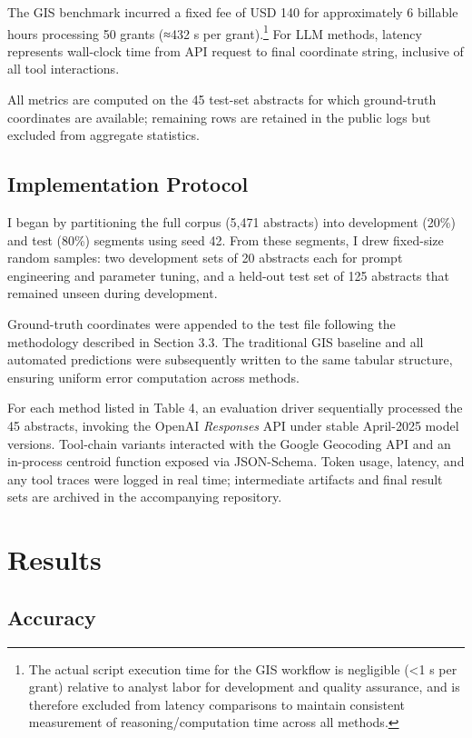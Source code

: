 The GIS benchmark incurred a fixed fee of USD 140 for approximately 6
billable hours processing 50 grants (≈432 s per grant).\footnote{The
  actual script execution time for the GIS workflow is negligible
  (\textless1 s per grant) relative to analyst labor for development and
  quality assurance, and is therefore excluded from latency comparisons
  to maintain consistent measurement of reasoning/computation time
  across all methods.} For LLM methods, latency represents wall-clock
time from API request to final coordinate string, inclusive of all tool
interactions.

All metrics are computed on the 45 test-set abstracts for which
ground-truth coordinates are available; remaining rows are retained in
the public logs but excluded from aggregate statistics.

\subsection{Implementation Protocol}\label{implementation-protocol}

I began by partitioning the full corpus (5,471 abstracts) into
development (20\%) and test (80\%) segments using seed 42. From these
segments, I drew fixed-size random samples: two development sets of 20
abstracts each for prompt engineering and parameter tuning, and a
held-out test set of 125 abstracts that remained unseen during
development.

Ground-truth coordinates were appended to the test file following the
methodology described in Section 3.3. The traditional GIS baseline and
all automated predictions were subsequently written to the same tabular
structure, ensuring uniform error computation across methods.

For each method listed in Table 4, an evaluation driver sequentially
processed the 45 abstracts, invoking the OpenAI \emph{Responses} API
under stable April-2025 model versions. Tool-chain variants interacted
with the Google Geocoding API and an in-process centroid function
exposed via JSON-Schema. Token usage, latency, and any tool traces were
logged in real time; intermediate artifacts and final result sets are
archived in the accompanying repository.

\section{Results}\label{results}

\subsection{Accuracy}\label{accuracy}

